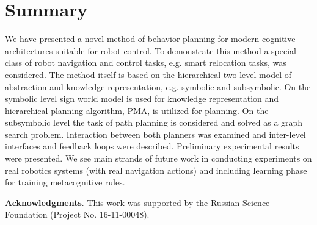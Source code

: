 \documentclass[procedia]{easychair}
\begin{document}
\section{Summary}
\label{sect:summary}

We have presented a novel method of behavior planning for modern cognitive architectures suitable for robot control. To demonstrate this method a special class of robot navigation and control tasks, e.g. smart relocation tasks, was considered. The method itself is based on the hierarchical two-level model of abstraction and knowledge representation, e.g. symbolic and subsymbolic. On the symbolic level sign world model is used for knowledge representation and hierarchical planning algorithm, PMA, is utilized for planning. On the subsymbolic level the task of path planning is considered and solved as a graph search problem. Interaction between both planners was examined and inter-level interfaces and feedback loops were described. Preliminary experimental results were presented. We see main strands of future work in conducting experiments on real robotics systems (with real navigation actions) and including learning phase for training metacognitive rules.

\textbf{Acknowledgments}. This work was supported by the Russian Science
Foundation (Project No. 16-11-00048).
%
\label{sect:bib}

%
%
%

\end{document}

